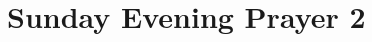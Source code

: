 \newpage

{%
\parindent 0pt
\noindent
\ifx\preLilyPondExample \undefined
\else
  \expandafter\preLilyPondExample
\fi
\def\lilypondbook{}%

\ifx\postLilyPondExample \undefined
\else
  \expandafter\postLilyPondExample
\fi
}


\null\medskip{%
\parindent 0pt
\noindent
\ifx\preLilyPondExample \undefined
\else
  \expandafter\preLilyPondExample
\fi
\def\lilypondbook{}%

\ifx\postLilyPondExample \undefined
\else
  \expandafter\postLilyPondExample
\fi
}

\newpage

\section{Sunday Evening Prayer 2}

{%
\parindent 0pt
\noindent
\ifx\preLilyPondExample \undefined
\else
  \expandafter\preLilyPondExample
\fi
\def\lilypondbook{}%

\ifx\postLilyPondExample \undefined
\else
  \expandafter\postLilyPondExample
\fi
}


\null\medskip{%
\parindent 0pt
\noindent
\ifx\preLilyPondExample \undefined
\else
  \expandafter\preLilyPondExample
\fi
\def\lilypondbook{}%

\ifx\postLilyPondExample \undefined
\else
  \expandafter\postLilyPondExample
\fi
}

\newpage

{%
\parindent 0pt
\noindent
\ifx\preLilyPondExample \undefined
\else
  \expandafter\preLilyPondExample
\fi
\def\lilypondbook{}%

\ifx\postLilyPondExample \undefined
\else
  \expandafter\postLilyPondExample
\fi
}



